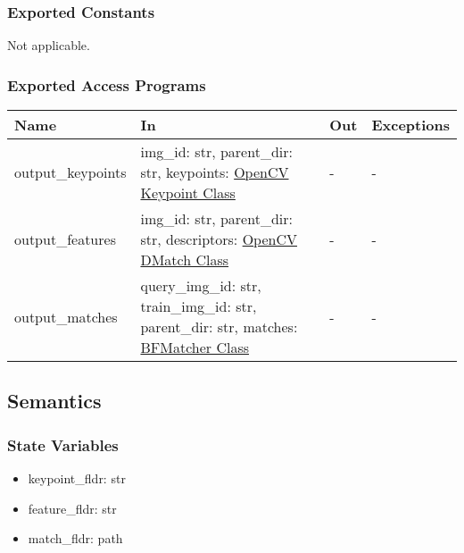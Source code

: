 \documentclass[12pt, titlepage]{article}
\begin{document}
\subsubsection{Exported Constants}
Not applicable.
\subsubsection{Exported Access Programs}

\begin{center}
  \begin{tabular}{p{3cm} p{4cm} p{4cm} p{2cm}}
  \hline
  \textbf{Name} & \textbf{In} & \textbf{Out} & \textbf{Exceptions} \\
  \hline
  output\_keypoints 
  & img\_id: str, \newline
  parent\_dir: str, \newline
  keypoints: \href{https://docs.opencv.org/3.4/d2/d29/classcv_1_1KeyPoint.html}{OpenCV Keypoint Class}
  & -  
  & - \\
  \hline
  output\_features 
  & img\_id: str, \newline
  parent\_dir: str, \newline
  descriptors: \href{https://docs.opencv.org/3.4/d4/de0/classcv_1_1DMatch.html}{OpenCV DMatch Class}
  & - 
  & - \\
  \hline
  output\_matches 
  & query\_img\_id: str, \newline
  train\_img\_id: str, \newline
  parent\_dir: str, \newline
  matches: \href{https://docs.opencv.org/3.4/d3/da1/classcv_1_1BFMatcher.html}{BFMatcher Class}
  & - 
  & - \\
  \hline
  \end{tabular}
  \end{center}
  
  \subsection{Semantics}
  
  \subsubsection{State Variables}
  \begin{itemize}
    \item keypoint\_fldr: str
    \item feature\_fldr: str
    \item match\_fldr: path
  \end{itemize}
  
\end{document}
